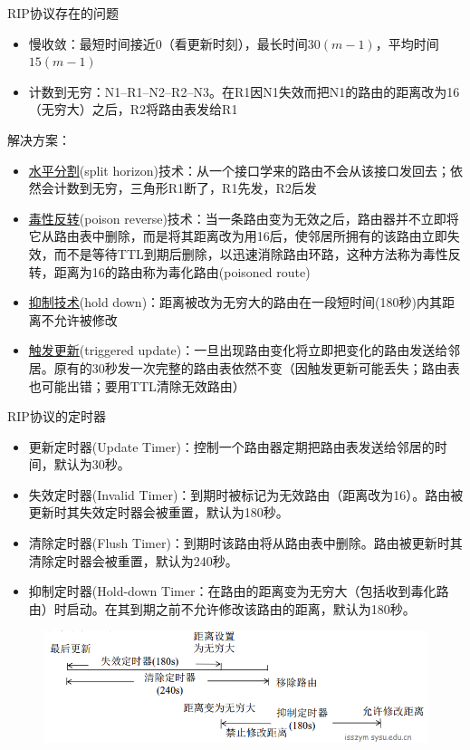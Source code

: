\myhline
RIP协议存在的问题
\begin{itemize}
	\item 慢收敛：最短时间接近$0$（看更新时刻），最长时间$30(m-1)$，平均时间$15(m-1)$
	\item 计数到无穷：N1--R1--N2--R2--N3。在R1因N1失效而把N1的路由的距离改为16（无穷大）之后，R2将路由表发给R1
\end{itemize}

解决方案：
\begin{itemize}
	\item \underline{水平分割}(split horizon)技术：从一个接口学来的路由不会从该接口发回去；依然会计数到无穷，三角形R1断了，R1先发，R2后发
	\item \underline{毒性反转}(poison reverse)技术：当一条路由变为无效之后，路由器并不立即将它从路由表中删除，而是将其距离改为用16后，使邻居所拥有的该路由立即失效，而不是等待TTL到期后删除，以迅速消除路由环路，这种方法称为毒性反转，距离为16的路由称为毒化路由(poisoned route)
	\item \underline{抑制技术}(hold down)：距离被改为无穷大的路由在一段短时间(180秒)内其距离不允许被修改
	\item \underline{触发更新}(triggered update)：一旦出现路由变化将立即把变化的路由发送给邻居。原有的30秒发一次完整的路由表依然不变（因触发更新可能丢失；路由表也可能出错；要用TTL清除无效路由）
\end{itemize}

\myhline
RIP协议的定时器
\begin{itemize}
\item 更新定时器(Update Timer)：控制一个路由器定期把路由表发送给邻居的时间，默认为30秒。
\item 失效定时器(Invalid Timer)：到期时被标记为无效路由（距离改为16）。路由被更新时其失效定时器会被重置，默认为180秒。
\item 清除定时器(Flush Timer)：到期时该路由将从路由表中删除。路由被更新时其清除定时器会被重置，默认为240秒。
\item 抑制定时器(Hold-down Timer：在路由的距离变为无穷大（包括收到毒化路由）时启动。在其到期之前不允许修改该路由的距离，默认为180秒。
\end{itemize}
\begin{figure}[H]
	\centering
	\includegraphics[width=0.7\linewidth]{fig/rip_timer.png}
\end{figure}


